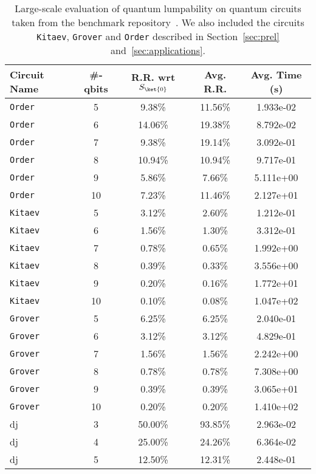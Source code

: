 \begin{table}[ht!]
\centering
\scriptsize
\caption{Large-scale evaluation of quantum lumpability on quantum circuits taken from the benchmark repository~\cite{quetschlich2022mqtbench}. We also included the circuits \texttt{Kitaev}, \texttt{Grover} and \texttt{Order} described in Section~\ref{sec:prel} and~\ref{sec:applications}. }
\label{table:benchmark}
\begin{tabular}{lc||ccc}
\toprule
Circuit Name~\cite{quetschlich2022mqtbench} & \#-qbits & R.R. wrt $S_{\ket{0}}$ & Avg. R.R. & Avg. Time (s) \\
\midrule
\midrule
\texttt{Order} & 5 & 9.38\% & 11.56\% & 1.933e-02 \\
\texttt{Order} & 6 & 14.06\% & 19.38\% & 8.792e-02 \\
\texttt{Order} & 7 & 9.38\% & 19.14\% & 3.092e-01 \\
\texttt{Order} & 8 & 10.94\% & 10.94\% & 9.717e-01 \\
\texttt{Order} & 9 & 5.86\% & 7.66\% & 5.111e+00 \\
\texttt{Order} & 10 & 7.23\% & 11.46\% & 2.127e+01 \\
\midrule
\texttt{Kitaev} & 5 & 3.12\% & 2.60\% & 1.212e-01 \\
\texttt{Kitaev} & 6 & 1.56\% & 1.30\% & 3.312e-01 \\
\texttt{Kitaev} & 7 & 0.78\% & 0.65\% & 1.992e+00 \\
\texttt{Kitaev} & 8 & 0.39\% & 0.33\% & 3.556e+00 \\
\texttt{Kitaev} & 9 & 0.20\% & 0.16\% & 1.772e+01 \\
\texttt{Kitaev} & 10 & 0.10\% & 0.08\% & 1.047e+02 \\
\midrule
\texttt{Grover} & 5 & 6.25\% & 6.25\% & 2.040e-01 \\
\texttt{Grover} & 6 & 3.12\% & 3.12\% & 4.829e-01 \\
\texttt{Grover} & 7 & 1.56\% & 1.56\% & 2.242e+00 \\
\texttt{Grover} & 8 & 0.78\% & 0.78\% & 7.308e+00 \\
\texttt{Grover} & 9 & 0.39\% & 0.39\% & 3.065e+01 \\
\texttt{Grover} & 10 & 0.20\% & 0.20\% & 1.410e+02 \\
\midrule
dj & 3 & 50.00\% & 93.85\% & 2.963e-02 \\
dj & 4 & 25.00\% & 24.26\% & 6.364e-02 \\
dj & 5 & 12.50\% & 12.31\% & 2.448e-01 \\

\end{tabular}
\end{table}
